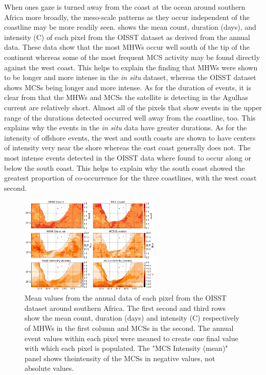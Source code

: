 \documentclass[a4paper,10pt,review]{elsarticle}
\begin{document}
When ones gaze is turned away from the coast at the ocean around southern Africa more broadly, the meso-scale patterns as they occur independent of the coastline may be more readily seen.  shows the mean count, duration (days), and intensity (\degree C) of each pixel from the OISST dataset as derived from the annual data. These data show that the most MHWs occur well south of the tip of the continent whereas some of the most frequent MCS activity may be found directly against the west coast. This helps to explain the finding that MHWs were shown to be longer and more intense in the \emph{in situ} dataset, whereas the OISST dataset shows MCSs being longer and more intense. As for the duration of events, it is clear from  that the MHWs and MCSs the satellite is detecting in the Agulhas current are relatively short. Almost all of the pixels that show events in the upper range of the durations detected occurred well away from the coastline, too. This explains why the events in the \emph{in situ} data have greater durations. As for the intensity of offshore events, the west and south coasts are shown to have centers of intensity very near the shore whereas the east coast generally does not. The most intense events detected in the OISST data where found to occur along or below the south coast. This helps to explain why the south coast showed the greatest proportion of co-occurrence for the three coastlines, with the west coast second.

\begin{figure}
\centering \includegraphics[width=0.6\textwidth]{MHW_MCS_mean.png}
\caption{Mean values from the annual data of each pixel from the OISST dataset around southern Africa. The first second and third rows show the mean count, duration (days) and intensity (\degree C) respectively of MHWs in the first column and MCSs in the second. The annual event values within each pixel were meaned to create one final value with which each pixel is populated. The "MCS Intensity (mean)" panel shows theintensity of the MCSs in negative values, not absolute values.} \label{fig:Figure6}
\end{figure}
\end{document}
